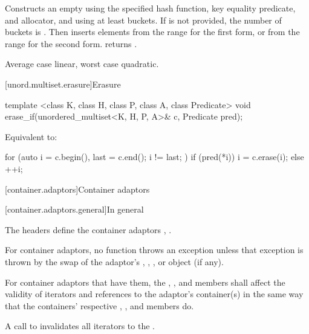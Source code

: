 \begin{itemdescr}
\pnum\effects
Constructs an empty  using the
specified hash function, key equality predicate, and allocator, and
using at least  buckets. If  is not
provided, the number of buckets is . Then
inserts elements from the range 
for the first form, or from the range
 for the second form.
 returns .

\pnum\complexity Average case linear, worst case quadratic.
\end{itemdescr}

[unord.multiset.erasure]{Erasure}

%
\begin{itemdecl}
template <class K, class H, class P, class A, class Predicate>
  void erase_if(unordered_multiset<K, H, P, A>& c, Predicate pred);
\end{itemdecl}

\begin{itemdescr}
\pnum
\effects
Equivalent to:
\begin{codeblock}
for (auto i = c.begin(), last = c.end(); i != last; ) {
  if (pred(*i)) {
    i = c.erase(i);
  } else {
    ++i;
  }
}
\end{codeblock}
\end{itemdescr}

[container.adaptors]{Container adaptors}

[container.adaptors.general]{In general}

\pnum
The headers   define the container adaptors ,
 .

\pnum
For container adaptors, no  function throws an exception unless
that exception is thrown by the swap of the
adaptor's , , , or
 object (if any).

\begin{addedblock}
\pnum
For container adaptors that have them, the , ,
and  members shall affect the validity of iterators and
references to the adaptor's container(s) in the same way that the containers'
respective , , and  members do.
\begin{example}
A call to  invalidates all iterators to
the .
\end{example}
\end{addedblock}

